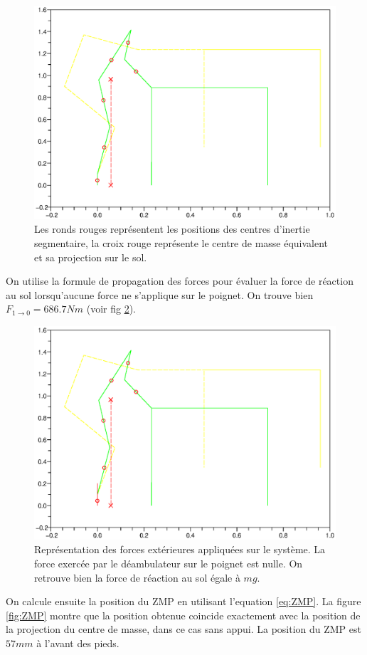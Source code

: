 \documentclass[a4paper, 10pt ]{article}
\begin{document}
 \begin{figure}[h]
\centering
\includegraphics[width=0.8\columnwidth]{images/simu/Fext0/COM.eps}
\caption{Les ronds rouges représentent les positions des centres d'inertie segmentaire, la croix rouge représente le centre de masse équivalent et sa projection sur le sol.}
\label{fig:COM}
\end{figure}

On utilise la formule de propagation des forces pour évaluer la force de réaction au sol lorsqu'aucune force ne s'applique sur le poignet. On trouve bien $F_{1\rightarrow 0}=686.7Nm$ (voir fig \ref{fig:Fext0}).

 \begin{figure}[h]
\centering
\includegraphics[width=0.8\columnwidth]{images/simu/Fext0/Fext0.eps}
\caption{Représentation des forces extérieures appliquées sur le système. La force exercée par le déambulateur sur le poignet est nulle. On retrouve bien la force de réaction au sol égale à $mg$.}
\label{fig:Fext0}
\end{figure}

On calcule ensuite la position du ZMP en utilisant l'equation \ref{eq:ZMP}. La figure \ref{fig:ZMP} montre que la position obtenue coincide exactement avec la position de la projection du centre de masse, dans ce cas sans appui. La position du ZMP est $57mm$ à l'avant des pieds.
\end{document}
